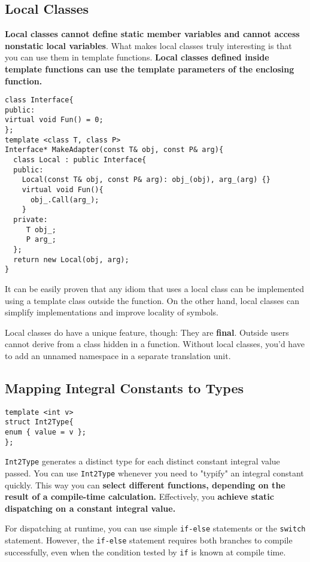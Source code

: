 \subsection{Local Classes}

\textbf{Local classes cannot define static member variables and cannot
  access nonstatic local variables}. What makes local classes truly
interesting is that you can use them in template functions. \textbf{Local
classes defined inside template functions can use the template
parameters of the enclosing function.}

\begin{verbatim}
class Interface{
public:
virtual void Fun() = 0;
};
template <class T, class P>
Interface* MakeAdapter(const T& obj, const P& arg){
  class Local : public Interface{
  public:
    Local(const T& obj, const P& arg): obj_(obj), arg_(arg) {}
    virtual void Fun(){
      obj_.Call(arg_);
    }
  private:
     T obj_;
     P arg_;
  };
  return new Local(obj, arg);
}
\end{verbatim}

It can be easily proven that any idiom that uses a local class can be
implemented using a template class outside the function. On the other
hand, local classes can simplify implementations and improve locality
of symbols.

Local classes do have a unique feature, though: They are
\textbf{final}. Outside users cannot derive from a class hidden in a
function. Without local classes, you'd have to add an unnamed
namespace in a separate translation unit.

\subsection{Mapping Integral Constants to Types}

\begin{verbatim}
template <int v>
struct Int2Type{
enum { value = v };
};
\end{verbatim}

\texttt{Int2Type} generates a distinct type for each distinct constant
integral value passed.  You can use \texttt{Int2Type} whenever you
need to "typify" an integral constant quickly. This way you can 
\textbf{select different functions, depending on the result of a
  compile-time calculation.} Effectively, you \textbf{achieve static
  dispatching on a constant integral value. }

For dispatching at runtime, you can use simple \texttt{if-else}
statements or the \texttt{switch} statement.  However, the
\texttt{if-else} statement requires both branches to compile
successfully, even when the condition tested by \texttt{if} is known
at compile time.

